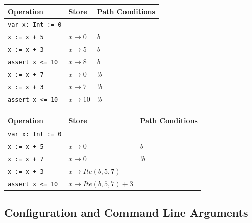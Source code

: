 \documentclass[11pt]{article}
\begin{document}
    \begin{center}
        \begin{tabular}{ l|l|l }
            Operation & Store & Path Conditions \\
            \hline
            \texttt{var x: Int := 0} & & \\
            \texttt{x := x + 5} & $x \mapsto 0$ & $b$ \\
            \texttt{x := x + 3} & $x \mapsto 5$ & $b$ \\
            \texttt{assert x <= 10} & $x \mapsto 8$ & $b$ \\
            \texttt{x := x + 7} & $x \mapsto 0$ & $!b$ \\
            \texttt{x := x + 3} & $x \mapsto 7$ & $!b$ \\
            \texttt{assert x <= 10} & $x \mapsto 10$ & $!b$ \\
        \end{tabular}
        \label{execution-1}
    \end{center}

    \begin{center}
        \begin{tabular}{ l|l|l }
            Operation & Store & Path Conditions \\
            \hline
            \texttt{var x: Int := 0} & & \\
            \texttt{x := x + 5} & $x \mapsto 0$ & $b$ \\
            \texttt{x := x + 7} & $x \mapsto 0$ & $!b$ \\
            \texttt{x := x + 3} & $x \mapsto Ite(b, 5, 7)$ & \\
            \texttt{assert x <= 10} & $x \mapsto Ite(b, 5, 7) + 3$ & \\
        \end{tabular}
        \label{execution-2}
    \end{center}

    \subsection{Configuration and Command Line Arguments}
\end{document}
